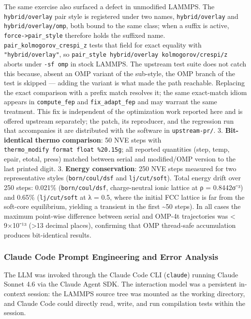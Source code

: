 \documentclass[
  11pt,
]{article}
\begin{document}
The same exercise also surfaced a defect in unmodified LAMMPS. The
\texttt{hybrid/overlay} pair style is registered under two names,
\texttt{hybrid/overlay} and \texttt{hybrid/overlay/omp}, both bound to
the same class; when a suffix is active,
\texttt{force-\textgreater{}pair\_style} therefore holds the suffixed
name. \texttt{pair\_kolmogorov\_crespi\_z} tests that field for exact
equality with \texttt{"hybrid/overlay"}, so
\texttt{pair\_style\ hybrid/overlay\ kolmogorov/crespi/z} aborts under
\texttt{-sf\ omp} in stock LAMMPS. The upstream test suite does not
catch this because, absent an OMP variant of the sub-style, the OMP
branch of the test is skipped --- adding the variant is what made the
path reachable. Replacing the exact comparison with a prefix match
resolves it; the same exact-match idiom appears in \texttt{compute\_fep}
and \texttt{fix\_adapt\_fep} and may warrant the same treatment. This
fix is independent of the optimization work reported here and is offered
upstream separately; the patch, its reproducer, and the regression run
that accompanies it are distributed with the software in
\texttt{upstream-pr/}. 3. \textbf{Bit-identical thermo comparison}: 50
NVE steps with \texttt{thermo\_modify\ format\ float\ \%20.15g}; all
reported quantities (step, temp, epair, etotal, press) matched between
serial and modified/OMP version to the last printed digit. 3.
\textbf{Energy conservation}: 250 NVE steps measured for two
representative styles (\texttt{born/coul/dsf} and \texttt{lj/cut/soft}).
Total energy drift over 250 steps: 0.021\% (\texttt{born/coul/dsf},
charge-neutral ionic lattice at ρ = 0.8442σ⁻³) and 0.65\%
(\texttt{lj/cut/soft} at λ = 0.5, where the initial FCC lattice is far
from the soft-core equilibrium, yielding a transient in the first
\textasciitilde50 steps). In all cases the maximum point-wise difference
between serial and OMP-4t trajectories was \textless{} 9×10⁻¹³
(\textgreater13 decimal places), confirming that OMP thread-safe
accumulation produces bit-identical results.

\subsubsection{Claude Code Prompt Engineering and Error
Analysis}\label{claude-code-prompt-engineering-and-error-analysis}

The LLM was invoked through the Claude Code CLI (\texttt{claude})
running Claude Sonnet 4.6 via the Claude Agent SDK. The interaction
model was a persistent in-context session: the LAMMPS source tree was
mounted as the working directory, and Claude Code could directly read,
write, and run compilation tests within the session.
\end{document}
